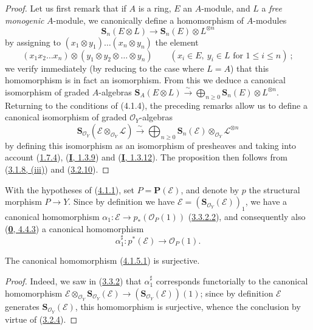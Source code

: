 \begin{proof}
Let us first remark that if $A$ is a ring, $E$ an $A$-module, and $L$ a
\emph{free monogenic} $A$-module, we canonically define a homomorphism
of $A$-modules
\[
  \mathbf{S}_n(E\otimes L)\longrightarrow
  \mathbf{S}_n(E)\otimes L^{\otimes n}
\]
by assigning to
$(x_1\otimes y_1)\ldots(x_n\otimes y_n)$ the element
\[
  (x_1x_2\ldots x_n)\otimes(y_1\otimes y_2\otimes\ldots\otimes y_n)
  \qquad(x_i\in E,\ y_i\in L\text{ for }1\leq i\leq n)~;
\]
we verify immediately (by reducing to the case where $L=A$) that this
homomorphism is in fact an isomorphism. From this we deduce a canonical
isomorphism of graded $A$-algebras
$\mathbf{S}_A(E\otimes L)\xrightarrow{\sim}
\bigoplus_{n\geq0}\mathbf{S}_n(E)\otimes L^{\otimes n}$. Returning to the
conditions of (4.1.4), the preceding remarks allow us to define a
canonical isomorphism of graded $\mathcal{O}_Y$-algebras
\[
\label{II.4.1.4.1}
  \mathbf{S}_{\mathcal{O}_Y}(\mathcal{E}\otimes_{\mathcal{O}_Y}\mathcal{L})
  \xrightarrow{\sim}
  \bigoplus_{n\geq0}\mathbf{S}_n(\mathcal{E})
  \otimes_{\mathcal{O}_Y}\mathcal{L}^{\otimes n}
\tag{4.1.4.1}
\]
by defining this isomorphism as an isomorphism of presheaves and
taking into account (\hyperref[II.1.7.4]{1.7.4}),
(\hyperref[I.1.3.9]{\textbf{I}, 1.3.9}) and
(\hyperref[I.1.3.12]{\textbf{I}, 1.3.12}). The proposition then follows from
(\hyperref[II.3.1.8]{3.1.8, (iii)}) and
(\hyperref[II.3.2.10]{3.2.10}).
\end{proof}

\begin{env}[4.1.5]
\label{II.4.1.5}
With the hypotheses of (\hyperref[II.4.1.1]{4.1.1}), set
$P=\mathbf{P}(\mathcal{E})$, and denote by $p$ the structural morphism
$P\to Y$. Since by definition we have
$\mathcal{E}=(\mathbf{S}_{\mathcal{O}_Y}(\mathcal{E}))_1$, we have a
canonical homomorphism
$\alpha_1:\mathcal{E}\to p_*(\mathcal{O}_P(1))$
(\hyperref[II.3.3.2.2]{3.3.2.2}), and consequently also
(\hyperref[0.4.4.3]{\textbf{0}, 4.4.3}) a canonical homomorphism
\[
\label{II.4.1.5.1}
  \alpha_1^\sharp:p^*(\mathcal{E})\longrightarrow\mathcal{O}_P(1).
\tag{4.1.5.1}
\]
\end{env}

\begin{proposition}[4.1.6]
\label{II.4.1.6}
The canonical homomorphism \textup{(\hyperref[II.4.1.5.1]{4.1.5.1})} is surjective.
\end{proposition}

\begin{proof}
Indeed, we saw in (\hyperref[II.3.3.2]{3.3.2}) that
$\alpha_1^\sharp$ corresponds functorially to the canonical homomorphism $\mathcal{E}\otimes_{\mathcal{O}_Y}\mathbf{S}_{\mathcal{O}_Y}(\mathcal{E})\longrightarrow(\mathbf{S}_{\mathcal{O}_Y}(\mathcal{E}))(1)$;
since by definition $\mathcal{E}$ generates
$\mathbf{S}_{\mathcal{O}_Y}(\mathcal{E})$, this homomorphism is surjective,
whence the conclusion by virtue of (\hyperref[II.3.2.4]{3.2.4}).
\end{proof}


